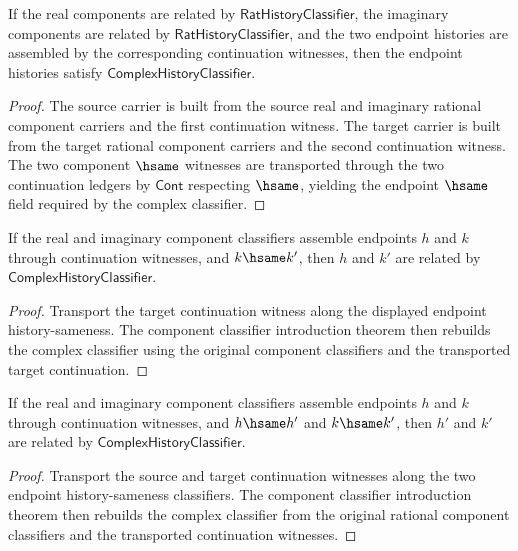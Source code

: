 \begin{theorem}
\label{thm:complex-history-classifier-component-classifier-intro}
If the real components are related by $\mathsf{RatHistoryClassifier}$, the
imaginary components are related by $\mathsf{RatHistoryClassifier}$, and the
two endpoint histories are assembled by the corresponding continuation
witnesses, then the endpoint histories satisfy
$\mathsf{ComplexHistoryClassifier}$.
\end{theorem}
\begin{proof}
The source carrier is built from the source real and imaginary rational
component carriers and the first continuation witness. The target carrier is
built from the target rational component carriers and the second continuation
witness. The two component $\hsame$ witnesses are transported through the two
continuation ledgers by $\mathsf{Cont}$ respecting $\hsame$, yielding the
endpoint $\hsame$ field required by the complex classifier.
\end{proof}

\begin{theorem}
\label{thm:complex-classifier-component-target-hsame-transport}
If the real and imaginary component classifiers assemble endpoints $h$ and $k$ through continuation witnesses, and $k\hsame k'$, then $h$ and $k'$ are related by $\mathsf{ComplexHistoryClassifier}$.
\end{theorem}
\begin{proof}
Transport the target continuation witness along the displayed endpoint history-sameness. The component classifier introduction theorem then rebuilds the complex classifier using the original component classifiers and the transported target continuation.
\end{proof}

\begin{theorem}
\label{thm:complex-history-classifier-component-hsame-transport}
If the real and imaginary component classifiers assemble endpoints $h$ and
$k$ through continuation witnesses, and $h\hsame h'$ and $k\hsame k'$, then
$h'$ and $k'$ are related by $\mathsf{ComplexHistoryClassifier}$.
\end{theorem}
\begin{proof}
Transport the source and target continuation witnesses along the two endpoint
history-sameness classifiers. The component classifier introduction theorem
then rebuilds the complex classifier from the original rational component
classifiers and the transported continuation witnesses.
\end{proof}


